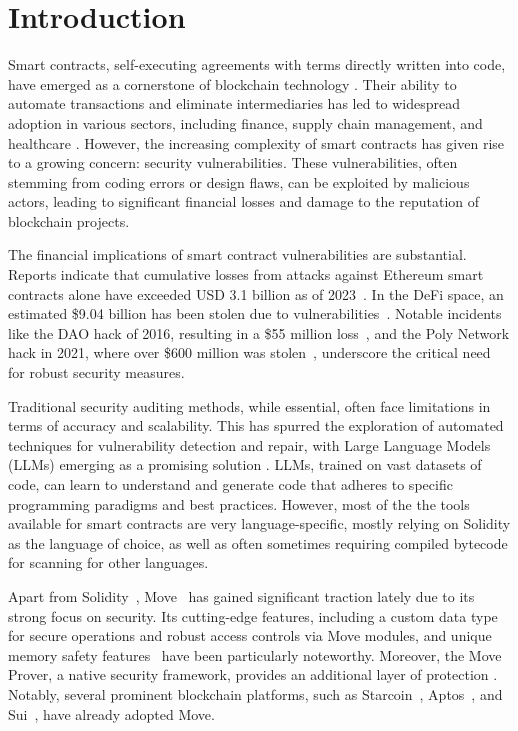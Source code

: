 \section{Introduction}

Smart contracts, self-executing agreements with terms directly written into code, have emerged as a cornerstone of blockchain technology \cite{nath2014web,ray2023web3}. Their ability to automate transactions and eliminate intermediaries has led to widespread adoption in various sectors, including finance, supply chain management, and healthcare \cite{zheng2018blockchain,karanjai2021conditional,kaleem2021event}. However, the increasing complexity of smart contracts has given rise to a growing concern: security vulnerabilities\cite{vacca2021systematic}. These vulnerabilities, often stemming from coding errors or design flaws, can be exploited by malicious actors, leading to significant financial losses and damage to the reputation of blockchain projects. 

The financial implications of smart contract vulnerabilities are substantial. Reports indicate that cumulative losses from attacks against Ethereum smart contracts alone have exceeded USD 3.1 billion as of 2023~\cite{li2023smart}. In the DeFi space, an estimated \$9.04 billion has been stolen due to vulnerabilities~\cite{wronka2023financial}. Notable incidents like the DAO hack of 2016, resulting in a \$55 million loss~\cite{popper2016hacking}, and the Poly Network hack in 2021, where over \$600 million was stolen~\cite{polyhack}, underscore the critical need for robust security measures. 

Traditional security auditing methods, while essential, often face limitations in terms of accuracy and scalability. This has spurred the exploration of automated techniques for vulnerability detection \cite{10.1145/3238147.3238177,wang2020contractward}and repair, with Large Language Models (LLMs) emerging as a promising solution \cite{joshi2023repair}. LLMs, trained on vast datasets of code, can learn to understand and generate code that adheres to specific programming paradigms and best practices. However, most of the the tools available for smart contracts are very language-specific, mostly relying on Solidity as the language of choice, as well as often sometimes requiring compiled bytecode for scanning for other languages\cite{song2024empirical}.

Apart from Solidity~\cite{dannen2017solidity}, Move~\cite{blackshear2019move} has gained significant traction lately due to its strong focus on security. Its cutting-edge features,
including a custom data type for secure operations and robust access controls via Move modules, and unique memory safety features~\cite{blackshear2022move} have been
particularly noteworthy. Moreover, the Move Prover, a native security framework, provides an additional layer of
protection \cite{dill2022fast}. Notably, several prominent blockchain platforms, such as Starcoin~\cite{starcoin}, Aptos~\cite{devaptos}, and Sui~\cite{blackshear2024sui}, have already adopted Move.

